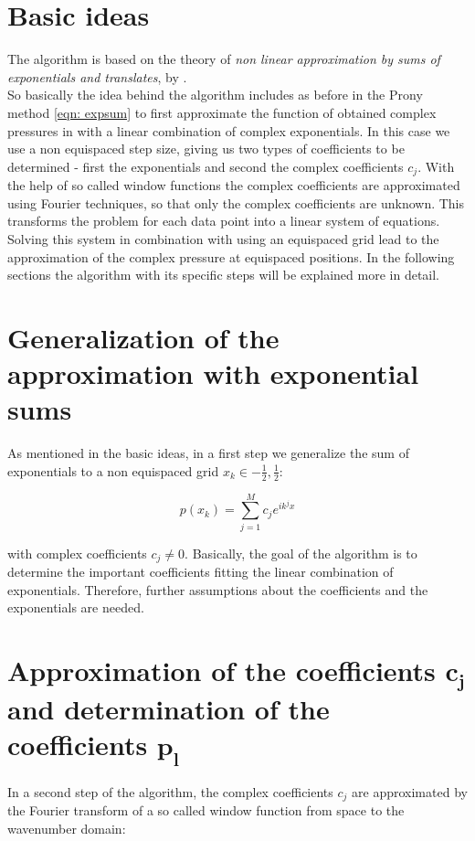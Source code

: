 \documentclass[11pt]{report} %
\begin{document}
\section{Basic ideas}
The algorithm is based on the theory of \textit{non linear approximation by sums of exponentials and translates}, by \cite{Peter2011}.\\
So basically the idea behind the algorithm includes as before in the Prony method \eqref{eqn: expsum} to first approximate the function of obtained complex pressures in with a linear combination of complex exponentials.
In this case we use a non equispaced step size, giving us two types of coefficients to be determined - first the exponentials and second the complex coefficients $c_j$. 
With the help of so called window functions the complex coefficients are approximated using Fourier techniques, so that only the complex coefficients are unknown. 
This transforms the problem for each data point into a linear system of equations.
Solving this system in combination with using an equispaced grid lead to the approximation of the complex pressure at equispaced positions.
In the following sections the algorithm with its specific steps will be explained more in detail. 

\section{Generalization of the approximation with exponential sums}
As mentioned in the basic ideas, in a first step we generalize the sum of exponentials to a non equispaced grid $x_k \in{-\frac{1}{2},\frac{1}{2}}$:

\begin{equation} \label{eqn: nonequi exp}
 p(x_k)=\sum\limits_{j=1}^M c_{j}e^{ik^{j}x}
\end{equation}

with complex coefficients $c_{j} \neq 0$.
Basically, the goal of the algorithm is to determine the important coefficients fitting the linear combination of exponentials.
Therefore, further assumptions about the coefficients and the exponentials are needed.  

\section{Approximation of the coefficients $\bm{c_j}$ and determination of the coefficients $\bm{p_l}$}
In a second step of the algorithm, the complex coefficients $c_j$ are approximated by the Fourier transform of a so called window function from space to the wavenumber domain: 
\end{document}

